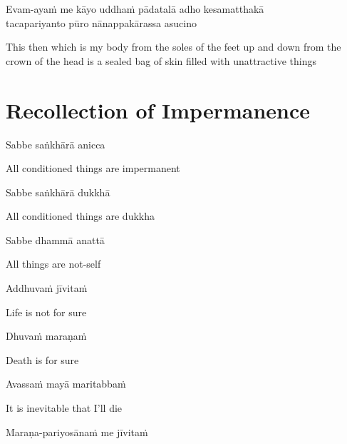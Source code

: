 Evam-ayaṁ me kāyo uddhaṁ pādatalā adho kesamatthakā\\
tacapariyanto pūro nānappakārassa asucino

\begin{english}
  This then which is my body from the soles of the feet up and down from the crown of the head is a sealed bag of skin filled with unattractive things
\end{english}


\clearpage

\section{Recollection of Impermanence}

\begin{leader}
\end{leader}

Sabbe saṅkhārā anicca

\begin{english}
  All conditioned things are impermanent
\end{english}

Sabbe saṅkhārā dukkhā

\begin{english}
  All conditioned things are dukkha
\end{english}

Sabbe dhammā anattā

\begin{english}
  All things are not-self
\end{english}


Addhuvaṁ jīvitaṁ

\begin{english}
  Life is not for sure
\end{english}

Dhuvaṁ maraṇaṁ

\begin{english}
  Death is for sure
\end{english}

Avassaṁ mayā maritabbaṁ

\begin{english}
  It is inevitable that I’ll die
\end{english}

Maraṇa-pariyosānaṁ me jīvitaṁ

